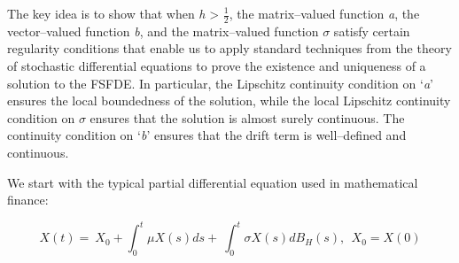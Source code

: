 \documentclass[12pt,a4paper]{report}
\numberwithin{equation}{section}
\begin{document}
The key idea is to show that when \emph{h} \textgreater{} $\frac{1}{2}$, the
matrix--valued function \emph{a}, the vector--valued function \emph{b},
and the matrix--valued function \emph{$\sigma$} satisfy certain regularity
conditions that enable us to apply standard techniques from the theory
of stochastic differential equations to prove the existence and
uniqueness of a solution to the FSFDE. In particular, the Lipschitz
continuity condition on `\emph{a}' ensures the local boundedness of the
solution, while the local Lipschitz continuity condition on \emph{$\sigma$}
ensures that the solution is almost surely continuous. The continuity
condition on `\emph{b}' ensures that the drift term is well--defined and
continuous.

We start with the typical partial differential equation used in
mathematical finance:

\[X(t) = \ X_{0} + \int_{0}^{t}{\mu X(s)ds + \ \int_{0}^{t}{\sigma X(s)dB_{H}(s),\ \ X_{0} = X(0)}}\]
\end{document}
